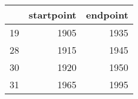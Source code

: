% 
\begin{tabular}{rrr}
  \hline
 & startpoint & endpoint \\ 
  \hline
19 & 1905 & 1935 \\ 
  28 & 1915 & 1945 \\ 
  30 & 1920 & 1950 \\ 
  31 & 1965 & 1995 \\ 
   \hline
\end{tabular}
